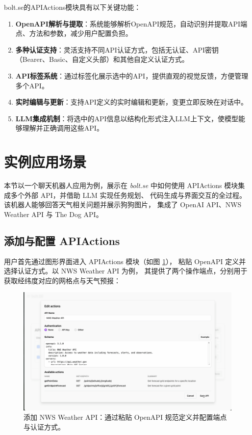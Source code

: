 bolt.se的APIActions模块具有以下关键功能：

\begin{enumerate}
  \item \textbf{OpenAPI解析与提取}：系统能够解析OpenAPI规范，自动识别并提取API端点、方法和参数，减少用户配置负担。
  
  \item \textbf{多种认证支持}：灵活支持不同API认证方式，包括无认证、API密钥（Bearer、Basic、自定义头部）和其他自定义认证方式。
  
  \item \textbf{API标签系统}：通过标签化展示选中的API，提供直观的视觉反馈，方便管理多个API。
  
  \item \textbf{实时编辑与更新}：支持API定义的实时编辑和更新，变更立即反映在对话中。
  
  \item \textbf{LLM集成机制}：将选中的API信息以结构化形式注入LLM上下文，使模型能够理解并正确调用这些API。
\end{enumerate}

\section{实例应用场景}

本节以一个聊天机器人应用为例，展示在 \emph{bolt.se} 中如何使用
APIActions 模块集成多个外部 API，并借助 LLM 实现任务规划、
代码生成与界面交互的全过程。该机器人能够回答天气相关问题并展示狗狗图片，
集成了 OpenAI API、NWS Weather API 与 The Dog API。

\subsection{添加与配置 APIActions}

用户首先通过图形界面进入 APIActions 模块（如图 \ref{fig:demo_edit}），
粘贴 OpenAPI 定义并选择认证方式。以 NWS Weather API 为例，
其提供了两个操作端点，分别用于获取经纬度对应的网格点与天气预报：

\begin{figure}[htbp]
  \centering
  \includegraphics[width=\textwidth]{figures/screenshots/api-actions/demo_edit_modal.png}
  \caption{添加 NWS Weather API：通过粘贴 OpenAPI 规范定义并配置端点与认证方式。}
  \label{fig:demo_edit}
\end{figure}

